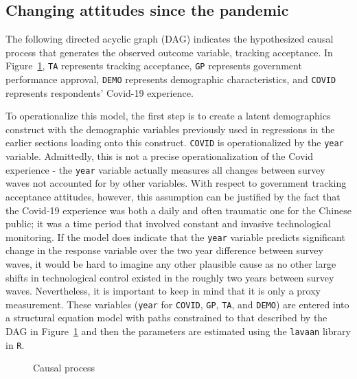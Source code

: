 \documentclass[
  letterpaper,
  DIV=11,
  numbers=noendperiod]{scrartcl}
\begin{document}
\subsection{Changing attitudes since the
pandemic}\label{changing-attitudes-since-the-pandemic}

The following directed acyclic graph (DAG) indicates the hypothesized
causal process that generates the observed outcome variable, tracking
acceptance. In Figure~\ref{fig-dag}, \texttt{TA} represents tracking
acceptance, \texttt{GP} represents government performance approval,
\texttt{DEMO} represents demographic characteristics, and \texttt{COVID}
represents respondents' Covid-19 experience.

To operationalize this model, the first step is to create a latent
demographics construct with the demographic variables previously used in
regressions in the earlier sections loading onto this construct.
\texttt{COVID} is operationalized by the \texttt{year} variable.
Admittedly, this is not a precise operationalization of the Covid
experience - the \texttt{year} variable actually measures all changes
between survey waves not accounted for by other variables. With respect
to government tracking acceptance attitudes, however, this assumption
can be justified by the fact that the Covid-19 experience was both a
daily and often traumatic one for the Chinese public; it was a time
period that involved constant and invasive technological monitoring. If
the model does indicate that the \texttt{year} variable predicts
significant change in the response variable over the two year difference
between survey waves, it would be hard to imagine any other plausible
cause as no other large shifts in technological control existed in the
roughly two years between survey waves. Nevertheless, it is important to
keep in mind that it is only a proxy measurement. These variables
(\texttt{year} for \texttt{COVID}, \texttt{GP}, \texttt{TA}, and
\texttt{DEMO}) are entered into a structural equation model with paths
constrained to that described by the DAG in Figure~\ref{fig-dag} and
then the parameters are estimated using the \texttt{lavaan} library in
\texttt{R}.

\begin{figure}


\caption{\label{fig-dag}Causal process}

\end{figure}%
\end{document}
